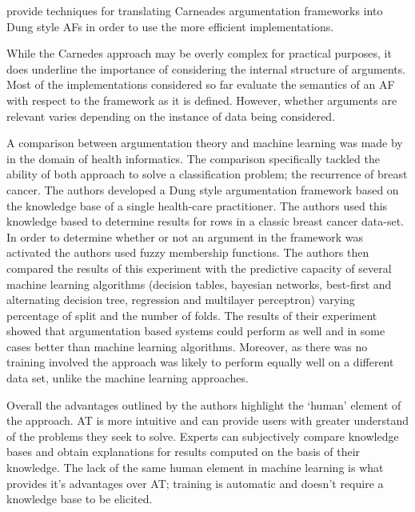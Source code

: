\cite{van2014principled} provide techniques for translating Carneades argumentation frameworks into Dung style AFs in order to use the more efficient implementations.

While the Carnedes approach may be overly complex for practical purposes, it does underline the importance of considering the internal structure of arguments. Most of the implementations considered so far evaluate the semantics of an AF with respect to the framework as it is defined. However, whether arguments are relevant varies depending on the instance of data being considered.

A comparison between argumentation theory and machine learning was made by \cite{longo2012argumentation} in the domain of health informatics. The comparison specifically tackled the ability of both approach to solve a classification problem; the recurrence of breast cancer. The authors developed a Dung style argumentation framework based on the knowledge base of a single health-care practitioner. The authors used this knowledge based to determine results for rows in a classic breast cancer data-set. In order to determine whether or not an argument in the framework was activated the authors used fuzzy membership functions. The authors then compared the results of this experiment with the predictive capacity of several machine learning algorithms (decision tables, bayesian networks, best-first and alternating decision tree, regression and multilayer perceptron) varying percentage of split and the number of folds. The results of their experiment showed that argumentation based systems could perform as well and in some cases better than machine learning algorithms. Moreover, as there was no training involved the approach was likely to perform equally well on a different data set, unlike the machine learning approaches.

Overall the advantages outlined by the authors highlight the `human' element of the approach. AT is more intuitive and can provide users with greater understand of the problems they seek to solve. Experts can subjectively compare knowledge bases and obtain explanations for results computed on the basis of their knowledge. The lack of the same human element in machine learning is what provides it's advantages over AT; training is automatic and doesn't require a knowledge base to be elicited. 

